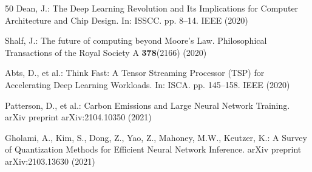 \documentclass[conference]{IEEEtran}
\begin{document}
\begin{thebibliography}{50}
 Dean, J.: The Deep Learning Revolution and Its Implications for Computer Architecture and Chip Design. In: ISSCC. pp. 8--14. IEEE (2020)

 Shalf, J.: The future of computing beyond Moore's Law. Philosophical Transactions of the Royal Society A \textbf{378}(2166) (2020)

 Abts, D., et al.: Think Fast: A Tensor Streaming Processor (TSP) for Accelerating Deep Learning Workloads. In: ISCA. pp. 145--158. IEEE (2020)

 Patterson, D., et al.: Carbon Emissions and Large Neural Network Training. arXiv preprint arXiv:2104.10350 (2021)

 Gholami, A., Kim, S., Dong, Z., Yao, Z., Mahoney, M.W., Keutzer, K.: A Survey of Quantization Methods for Efficient Neural Network Inference. arXiv preprint arXiv:2103.13630 (2021)

\end{thebibliography}
\end{document}
